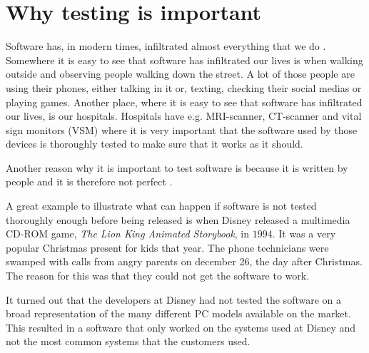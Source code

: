 \section{Why testing is important}
Software has, in modern times, infiltrated almost everything that we do \cite{SoftwareTesting}.
Somewhere it is easy to see that software has infiltrated our lives is when walking outside and observing people walking down the street.
A lot of those people are using their phones, either talking in it or, texting, checking their social medias or playing games.
Another place, where it is easy to see that software has infiltrated our lives, is our hospitals.
Hospitals have e.g. MRI-scanner, CT-scanner and vital sign monitors (VSM) where it is very important that the software used by those devices is thoroughly tested to make sure that it works as it should.

Another reason why it is important to test software is because it is written by people and it is therefore not perfect \cite{SoftwareTesting}.

A great example to illustrate what can happen if software is not tested thoroughly enough before being released is when Disney released a multimedia CD-ROM game, \textit{The Lion King Animated Storybook}, in $1994$.
It was a very popular Christmas present for kids that year.
The phone technicians were swamped with calls from angry parents on december 26, the day after Christmas.
The reason for this was that they could not get the software to work. \cite{SoftwareTesting}

It turned out that the developers at Disney had not tested the software on a broad representation of the many different PC models available on the market.
This resulted in a software that only worked on the systems used at Disney and not the most common systems that the customers used. \cite{SoftwareTesting}
